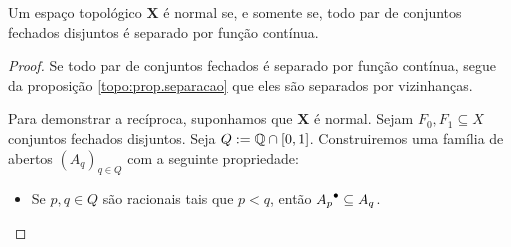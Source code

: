 \begin{proposition}
Um espaço topológico $\bm X$ é normal se, e somente se, todo par de conjuntos fechados disjuntos é separado por função contínua.
\end{proposition}
\begin{proof}
Se todo par de conjuntos fechados é separado por função contínua, segue da proposição \ref{topo:prop.separacao} que eles são separados por vizinhanças.

Para demonstrar a recíproca, suponhamos que $\bm X$ é normal. Sejam $F_0,F_1 \subseteq X$ conjuntos fechados disjuntos. Seja $Q := \mathbb{Q} \cap \left[0,1\right]$. Construiremos uma família de abertos $(A_q)_{q \in Q}$ com a seguinte propriedade:
	\begin{itemize}
	\item Se $p,q \in Q$ são racionais tais que $p<q$, então ${A_p}^\bullet \subseteq A_q$.
	\end{itemize}


\end{proof}
